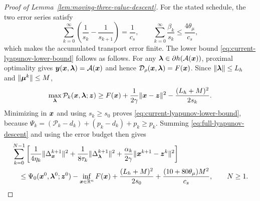 \begin{proof}[Proof of Lemma~\ref{lem:moving-three-value-descent}]
For the stated schedule, the two error series satisfy
\[
\sum_{k=0}^\infty\left(\frac1{s_k}-\frac1{s_{k+1}}\right)=\frac1{c_s},
\qquad
\sum_{k=0}^\infty\frac{\beta_k}{s_k}
\le\frac{4\theta_\mu}{c_s},
\]
which makes the accumulated transport error finite. The lower bound
\eqref{eq:current-lyapunov-lower-bound} follows as follows. For any
$\bm{\lambda}\in\partial h(\mathcal{A}(\bm{x}))$, proximal optimality gives
$\bm{y}(\bm{x},\bm{\lambda})=\mathcal{A}(\bm{x})$ and hence
$\mathcal D_\rho(\bm{x},\bm{\lambda})=F(\bm{x})$. Since
$\|\bm{\lambda}\|\le L_h$ and $\|\bm{\mu}^k\|\le M$,
\[
\max_{\bm{\lambda}}\mathcal P_k(\bm{x},\bm{\lambda};\bm{z})
\ge F(\bm{x})+\frac1{2\gamma}\|\bm{x}-\bm{z}\|^2
-\frac{(L_h+M)^2}{2s_k}.
\]
Minimizing in $\bm{x}$ and using $s_k\ge s_0$ proves
\eqref{eq:current-lyapunov-lower-bound}, because
$\Psi_k=(\mathcal P_k-d_k)+(p_k-d_k)+p_k\ge p_k$.
Summing \eqref{eq:full-lyapunov-descent} and using the error budget
then gives
\[
\begin{aligned}
&\sum_{k=0}^{N-1}\left[
\frac1{4\eta_k}\|\Delta_{\bm{x}}^{k+1}\|^2
+\frac1{8\tau_k}\|\Delta_{\bm{\lambda}}^{k+1}\|^2
+\frac{\alpha_k}{2\gamma}\|\bm{x}^{k+1}-\bm{z}^k\|^2\right] \\
&\quad\le
\Psi_0(\bm{x}^0,\bm{\lambda}^0;\bm{z}^0)-\inf_{\bm{x}\in\mathbb{R}^n}F(\bm{x})
+\frac{(L_h+M)^2}{2s_0}
+\frac{(10+80\theta_\mu)M^2}{c_s},
\qquad N\ge1.
\end{aligned}
\]
\end{proof}



